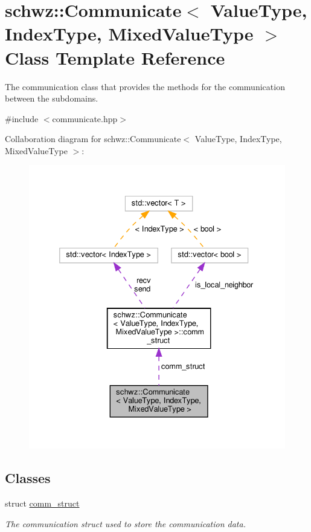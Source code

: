\hypertarget{classschwz_1_1Communicate}{}\section{schwz\+:\+:Communicate$<$ Value\+Type, Index\+Type, Mixed\+Value\+Type $>$ Class Template Reference}
\label{classschwz_1_1Communicate}


The communication class that provides the methods for the communication between the subdomains.  




{\ttfamily \#include $<$communicate.\+hpp$>$}



Collaboration diagram for schwz\+:\+:Communicate$<$ Value\+Type, Index\+Type, Mixed\+Value\+Type $>$\+:
\nopagebreak
\begin{figure}[H]
\begin{center}
\leavevmode
\includegraphics[width=332pt]{classschwz_1_1Communicate__coll__graph}
\end{center}
\end{figure}
\subsection*{Classes}
\begin{DoxyCompactItemize}
\item 
struct \hyperlink{structschwz_1_1Communicate_1_1comm__struct}{comm\+\_\+struct}
\begin{DoxyCompactList}\small\item\em The communication struct used to store the communication data. \end{DoxyCompactList}\end{DoxyCompactItemize}
